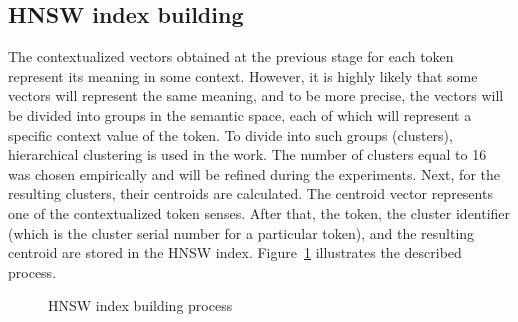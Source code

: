 \documentclass[
    twocolumn,
]{template/ceurart}
\begin{document}
    \subsection{HNSW index building}
    The contextualized vectors obtained at the previous stage for each token represent its meaning in some context.
    However, it is highly likely that some vectors will represent the same meaning, and to be more precise,
    the vectors will be divided into groups in the semantic space,
    each of which will represent a specific context value of the token.
    To divide into such groups (clusters), hierarchical clustering is used in the work.
    The number of clusters equal to 16 was chosen empirically and will be refined during the experiments.
    Next, for the resulting clusters, their centroids are calculated.
    The centroid vector represents one of the contextualized token senses.
    After that, the token, the cluster identifier (which is the cluster serial number for a particular token),
    and the resulting centroid are stored in the HNSW index.
    Figure~\ref{fig:hnswIndexBuilding} illustrates the described process.
    \begin{figure}
        \centering
        
        \caption{HNSW index building process}
        \label{fig:hnswIndexBuilding}
    \end{figure}

    
\end{document}
